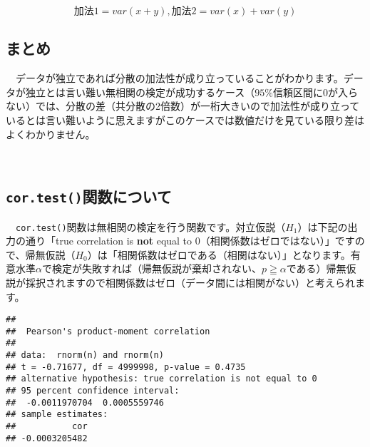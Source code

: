 \documentclass[a4paper]{tufte-handout}
\begin{document}
\begin{table}

\caption{\label{tab:unnamed-chunk-5}ランダムサンプリングしたデータが独立でない場合}
\centering
{}
\end{table}

\[\mbox{加法1} = var(x + y),　\mbox{加法2} = var(x) + var(y)\]

\newpage

\hypertarget{ux307eux3068ux3081}{%
\subsection{まとめ}\label{ux307eux3068ux3081}}

　データが独立であれば分散の加法性が成り立っていることがわかります。データが独立とは言い難い無相関の検定が成功するケース（\(95\%\)信頼区間に\(0\)が入らない）では、分散の差（共分散の2倍数）が一桁大きいので加法性が成り立っているとは言い難いように思えますがこのケースでは数値だけを見ている限り差はよくわかりません。

　

\hypertarget{cor.testux95a2ux6570ux306bux3064ux3044ux3066}{%
\subsection{\texorpdfstring{\texttt{cor.test()}関数について}{cor.test()関数について}}\label{cor.testux95a2ux6570ux306bux3064ux3044ux3066}}

　\texttt{cor.test()}関数は無相関の検定を行う関数です。対立仮説（\(H_1\)）は下記の出力の通り「true
correlation is \textbf{not} equal to
0（相関係数はゼロではない）」ですので、帰無仮説（\(H_0\)）は「相関係数はゼロである（相関はない）」となります。有意水準\(\alpha\)で検定が失敗すれば（帰無仮説が棄却されない、\(p \geqq \alpha\)である）帰無仮説が採択されますので相関係数はゼロ（データ間には相関がない）と考えられます。

\begin{verbatim}
## 
##  Pearson's product-moment correlation
## 
## data:  rnorm(n) and rnorm(n)
## t = -0.71677, df = 4999998, p-value = 0.4735
## alternative hypothesis: true correlation is not equal to 0
## 95 percent confidence interval:
##  -0.0011970704  0.0005559746
## sample estimates:
##           cor 
## -0.0003205482
\end{verbatim}
\end{document}
